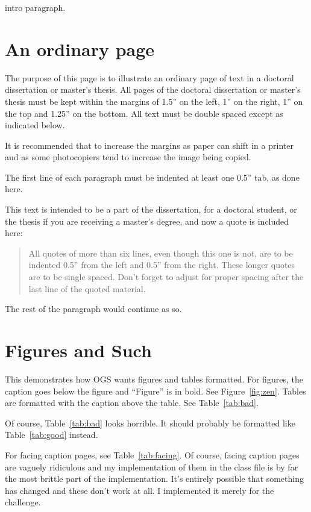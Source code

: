 \documentclass[12pt]{ucsddissertation}
\begin{document}
\begin{dissertationintroduction}
intro paragraph.
\end{dissertationintroduction}

\chapter{An ordinary page}
The purpose of this page is to illustrate an ordinary page of text in
a doctoral dissertation or master's thesis. All pages of the doctoral
dissertation or master's thesis must be kept within the margins of
1.5'' on the left, 1'' on the right, 1'' on the top and 1.25'' on the
bottom. All text must be double spaced except as indicated below.

It is recommended that to increase the margins as paper can shift in a
printer and as some photocopiers tend to increase the image being
copied.

The first line of each paragraph must be indented at least one 0.5''
tab, as done here.

This text is intended to be a part of the dissertation, for a doctoral
student, or the thesis if you are receiving a master's degree, and now
a quote is included here:
\begin{quote}
All quotes of more than six lines, even though this one is not, are to
be indented 0.5'' from the left and 0.5'' from the right. These longer
quotes are to be single spaced. Don't forget to adjust for proper
spacing after the last line of the quoted material.
\end{quote}
The rest of the paragraph would continue as so.

\chapter{Figures and Such}
This demonstrates how OGS wants figures and tables formatted. For
figures, the caption goes below the figure and ``Figure'' is in bold.
See Figure~\ref{fig:zen}. Tables are formatted with the caption above
the table. See Table~\ref{tab:bad}.

Of course, Table~\ref{tab:bad} looks horrible. It should probably be
formatted like Table~\ref{tab:good} instead.

For facing caption pages, see Table~\ref{tab:facing}. Of course,
facing caption pages are vaguely ridiculous and my implementation of
them in the class file is by far the most brittle part of the
implementation. It's entirely possible that something has changed and
these don't work at all. I implemented it merely for the challenge.
\end{document}
